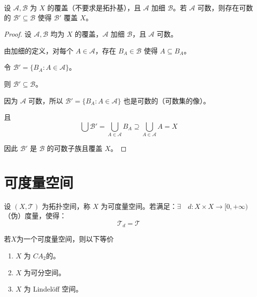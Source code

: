 \documentclass[lang=cn,a4paper,newtx,figureplace=section,tableplace=section]{elegantbook}
\begin{document}
\begin{lemma}\label{lem:refinement-cover}
设 $\mathcal{A}, \mathcal{B}$ 为 $X$ 的覆盖（不要求是拓扑基），且 $\mathcal{A}$ 加细 $\mathcal{B}$。若 $\mathcal{A}$ 可数，则存在可数的 $\mathcal{B}' \subseteq \mathcal{B}$ 使得 $\mathcal{B}'$ 覆盖 $X$。
\end{lemma}
\begin{proof}
设 $\mathcal{A}, \mathcal{B}$ 均为 $X$ 的覆盖，$\mathcal{A}$ 加细 $\mathcal{B}$，且 $\mathcal{A}$ 可数。

由加细的定义，对每个 $A \in \mathcal{A}$，存在 $B_A \in \mathcal{B}$ 使得 $A \subseteq B_A$。

令 $\mathcal{B}' = \{B_A : A \in \mathcal{A}\}$。

则 $\mathcal{B}' \subseteq \mathcal{B}$。

因为 $\mathcal{A}$ 可数，所以 $\mathcal{B}' = \{B_A : A \in \mathcal{A}\}$ 也是可数的（可数集的像）。

且
\begin{equation}
\bigcup \mathcal{B}' = \bigcup_{A \in \mathcal{A}} B_A \supseteq \bigcup_{A \in \mathcal{A}} A = X
\end{equation}

因此 $\mathcal{B}'$ 是 $\mathcal{B}$ 的可数子族且覆盖 $X$。
\end{proof}

\section{可度量空间}

\begin{definition}[可度量空间]
    设 $(X, \mathcal{T})$ 为拓扑空间，称 $X$ 为可度量空间。若满足：$\exists \quad d: X \times X \to [0, +\infty)$（伪）度量，使得：
    \begin{equation}
        \mathcal{T}_d=\mathcal{T}
    \end{equation}
\end{definition}

\begin{property}
若$X$为一个可度量空间，则以下等价
\begin{enumerate}
    \item $X$ 为 $CA_2$的。
    \item $X$ 为可分空间。
    \item $X$ 为 Lindelöff 空间。
\end{enumerate}
\end{property}
\end{document}
